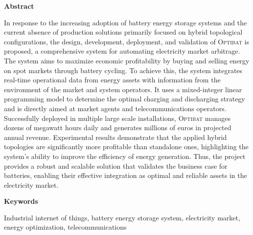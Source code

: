 \begin{center}
  {\bf \huge Abstract}
\end{center}

\vspace{1cm}

In response to the increasing adoption of battery energy storage systems and the current absence of production solutions primarily focused on hybrid topological configurations, the design, development, deployment, and validation of \textsc{Optibat} is proposed, a comprehensive system for automating electricity market arbitrage. The system aims to maximize economic profitability by buying and selling energy on spot markets through battery cycling. To achieve this, the system integrates real-time operational data from energy assets with information from the environment of the market and system operators. It uses a mixed-integer linear programming model to determine the optimal charging and discharging strategy and is directly aimed at market agents and telecommunications operators. Successfully deployed in multiple large scale installations, \textsc{Optibat} manages dozens of megawatt hours daily and generates millions of euros in projected annual revenue. Experimental results demonstrate that the applied hybrid topologies are significantly more profitable than standalone ones, highlighting the system's ability to improve the efficiency of energy generation. Thus, the project provides a robust and scalable solution that validates the business case for batteries, enabling their effective integration as optimal and reliable assets in the electricity market.

\vspace{1cm}

\begin{center}
  {\bf \large Keywords}
\end{center}

\vspace{0.5cm}

Industrial internet of things, battery energy storage system, electricity market, energy optimization, telecommunications
